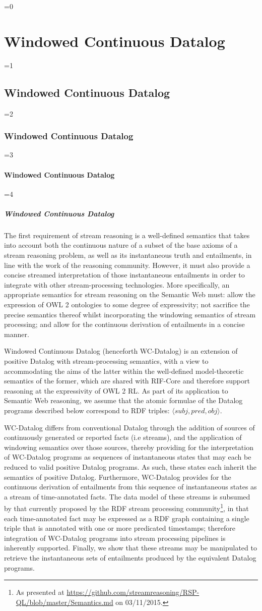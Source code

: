 \documentclass[twocolumn,preprint,3p,number]{elsarticle}
\theoremstyle{plain}
\theoremstyle{definition}
\newcounter{nestingdepth}
\newenvironment{nestedsection}[2]{
  \ifnum\value{nestingdepth}=0
    \chapter{#1}
  \else
    \ifnum\value{nestingdepth}=1
      \section{#1}
    \else
      \ifnum\value{nestingdepth}=2
        \subsection{#1}
      \else
        \ifnum\value{nestingdepth}=3
          \subsubsection{#1}
        \else
          \ifnum\value{nestingdepth}=4
            \paragraph{#1}
          \else
            \PackageError{nestedsections}{Maximum nesting level exceeded!}{uh oh!}
          \fi
        \fi
      \fi
    \fi
  \fi
  \addtocounter{nestingdepth}{1}
  \label{sec:#2}
}{\addtocounter{nestingdepth}{-1}}
\begin{document}
\begin{nestedsection}{Windowed Continuous Datalog}{semantics}
The first requirement of stream reasoning is a well-defined semantics
that takes into account both the continuous nature of a subset of the
base axioms of a stream reasoning problem, as well as its
instantaneous truth and entailments, in line with the work of the
reasoning community.  However, it must also provide a concise streamed
interpretation of those instantaneous entailments in order to
integrate with other stream-processing technologies.  More
specifically, an appropriate semantics for stream reasoning on the
Semantic Web must: allow the expression of OWL 2 ontologies to some
degree of expressivity; not sacrifice the precise semantics thereof
whilst incorporating the windowing semantics of stream processing; and allow for
the continuous derivation of entailments in a concise manner.

Windowed Continuous Datalog (henceforth WC-Datalog) is an extension of positive
Datalog with stream-processing semantics, with a view to accommodating
the aims of the latter within the well-defined model-theoretic
semantics of the former, which are shared with RIF-Core
\cite{w3crifbld} and therefore support reasoning at the expressivity
of OWL 2 RL. As part of its application to Semantic Web reasoning, we
assume that the atomic formulae of the Datalog programs described
below correspond to RDF triples: $\langle subj, pred, obj\rangle$.

WC-Datalog differs from conventional Datalog through the addition of
sources of continuously generated or reported facts (i.e streams), and
the application of windowing semantics over those sources,
thereby providing for the interpretation of WC-Datalog programs as
sequences of instantaneous states that may each be reduced to valid positive Datalog
programs.  As such, these states each inherit the semantics of
positive Datalog.  Furthermore, WC-Datalog provides for the continuous derivation
of entailments from this sequence of instantaneous states as a stream
of time-annotated facts. The data model of these streams is subsumed by that currently proposed
by the RDF stream processing community\footnote{As presented at
\url{https://github.com/streamreasoning/RSP-QL/blob/master/Semantics.md}
on \mbox{03/11/2015}.}, in that each time-annotated fact may be expressed as a
RDF graph containing a single triple that is annotated with one or more
predicated timestamps; therefore integration of WC-Datalog programs
into stream processing pipelines is inherently supported. Finally, we show that these streams may be
manipulated to retrieve the instantaneous sets of entailments produced
by the equivalent Datalog programs.


\end{nestedsection}
\end{document}

